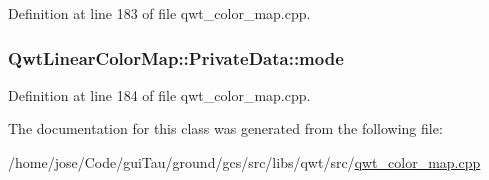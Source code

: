 Definition at line 183 of file qwt\-\_\-color\-\_\-map.\-cpp.

\hypertarget{class_qwt_linear_color_map_1_1_private_data_a2bfd4a288590f250b78a085b64468fba}{
\subsubsection[{mode}]{ Qwt\-Linear\-Color\-Map\-::\-Private\-Data\-::mode}}\label{class_qwt_linear_color_map_1_1_private_data_a2bfd4a288590f250b78a085b64468fba}


Definition at line 184 of file qwt\-\_\-color\-\_\-map.\-cpp.



The documentation for this class was generated from the following file\-:\begin{DoxyCompactItemize}
\item 
/home/jose/\-Code/gui\-Tau/ground/gcs/src/libs/qwt/src/\hyperlink{qwt__color__map_8cpp}{qwt\-\_\-color\-\_\-map.\-cpp}\end{DoxyCompactItemize}
